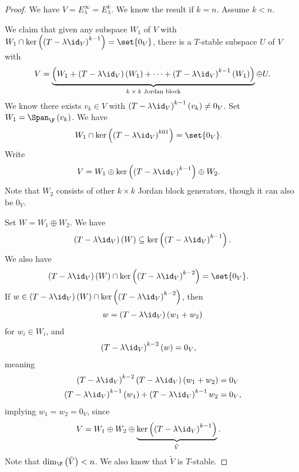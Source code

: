 \documentclass[10pt]{mypackage}
\begin{document}
\begin{proof}
  We have $V = E_{\lambda}^{\infty} = E_{\lambda}^{k}$. We know the result if $k = n$. Assume $k < n$.\newline

  We claim that given any subspace $W_1$ of $V$ with $W_1\cap \ker\left(\left(T-\lambda\id_{V}\right)^{k-1}\right) = \set{0_V}$, there is a $T$-stable subspace $U$ of $V$ with 
  \begin{align*}
    V =\underbrace{\left( W_1 + \left(T-\lambda\id_V\right)\left(W_1\right) + \cdots + \left(T-\lambda\id_V\right)^{k-1}(W_1)\right)}_{\text{$k\times k$ Jordan block}}\oplus U.
  \end{align*}
  We know there exists $v_k\in V$ with $\left(T-\lambda\id_V\right)^{k-1}\left(v_k\right) \neq 0_V$. Set $W_1 = \Span_{\F}\left(v_k\right)$. We have
  \begin{align*}
    W_1\cap \ker\left(\left(T-\lambda\id_V\right)^{k01}\right) &= \set{0_V}.
  \end{align*}
  Write
  \begin{align*}
    V &= W_1\oplus \ker\left(\left(T-\lambda\id_V\right)^{k-1}\right)\oplus W_2.
  \end{align*}
  Note that $W_2$ consists of other $k\times k$ Jordan block generators, though it can also be $0_V$.\newline

  Set $W = W_1\oplus W_2$. We have 
  \begin{align*}
    \left(T-\lambda\id_V\right)(W)\subseteq \ker\left(\left(T-\lambda\id_V\right)^{k-1}\right).
  \end{align*}
  We also have
  \begin{align*}
    \left(T-\lambda\id_V\right)\left(W\right)\cap \ker\left(\left(T-\lambda\id_V\right)^{k-2}\right) &= \set{0_V}.
  \end{align*}
  If $w\in \left(T-\lambda\id_V\right)\left(W\right)\cap \ker\left(\left(T-\lambda\id_V\right)^{k-2}\right)$, then
  \begin{align*}
    w = \left(T-\lambda\id_V\right)\left(w_1 + w_2\right)
  \end{align*}
  for $w_i\in W_i$, and
  \begin{align*}
    \left(T-\lambda\id_V\right)^{k-2}\left(w\right) &= 0_V,
  \end{align*}
  meaning
  \begin{align*}
    \left(T-\lambda\id_V\right)^{k-2}\left(T-\lambda\id_V\right)\left(w_1 + w_2\right) &= 0_V\\
    \left(T-\lambda\id_V\right)^{k-1}\left(w_1\right) + \left(T-\lambda\id_V\right)^{k-1}w_2 &= 0_V,
  \end{align*}
  implying $w_1 = w_2 = 0_V$, since
  \begin{align*}
    V &= W_1 \oplus W_2 \oplus \underbrace{\ker\left(\left(T-\lambda\id_V\right)^{k-1}\right)}_{\tilde{V}}.
  \end{align*}
  Note that $\dim_{\F}\left(\tilde{V}\right) < n$. We also know that $\tilde{V}$ is $T$-stable.\newline


\end{proof}
\end{document}
